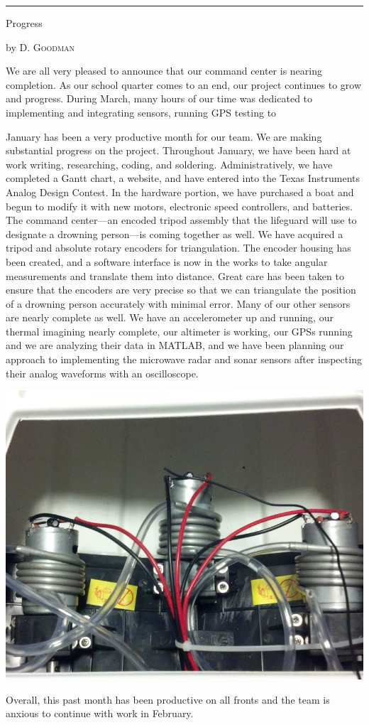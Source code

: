 \documentclass[10pt,a4paper]{article}
\newcommand{\SepRule}{\noindent							 %
						\begin{center}
							\rule{250pt}{1pt}
						\end{center}
						}
\newcommand{\NewsItem}[1]{%
		\usefont{T1}{augie}{m}{n} 	
		\large #1 \vspace{4pt}
		\par \normalsize \normalfont}
\newcommand{\NewsAuthor}[1]{%
			\hfill by \textsc{#1} \vspace{4pt}
			\par \normalfont}
\begin{document}
% 
\vspace{0.5cm}
	\SepRule
\vspace{0.5cm}
\begin{multicols}{3}
	\NewsItem{Progress}
	\NewsAuthor{D. Goodman}
    
    We are all very pleased to announce that our command center is nearing completion. As our school quarter comes to an end, our project continues to grow and progress. During March, many hours of our time was dedicated to implementing and integrating sensors, running GPS testing to 

    

	January has been a very productive month for our team. We are making substantial progress on the project. Throughout January, we have been hard at work writing, researching, coding, and soldering. Administratively, we have completed a Gantt chart, a website, and have entered into the Texas Instruments Analog Design Contest. In the hardware portion, we have purchased a boat and begun to modify it with new motors, electronic speed controllers, and batteries.  The command center---an encoded tripod assembly that the lifeguard will use to designate a drowning person---is coming together as well. We have acquired a tripod and absolute rotary encoders for triangulation. The encoder housing has been created, and a software interface is now in the works to take angular measurements and translate them into distance. Great care has been taken to ensure that the encoders are very precise so that we can triangulate the position of a drowning person accurately with minimal error. Many of our other sensors are nearly complete as well. We have an accelerometer up and running, our thermal imagining nearly complete, our altimeter is working, our GPSs running and we are analyzing their data in MATLAB, and we have been planning our approach to implementing the microwave radar and sonar sensors after inspecting their analog waveforms with an oscilloscope. 
\begin{center}
			\includegraphics[width=0.78\linewidth]{old_motors.jpg}
		\end{center}
Overall, this past month has been productive on all fronts and the team is anxious to continue with work in February.
		

\end{multicols}
\end{document}
